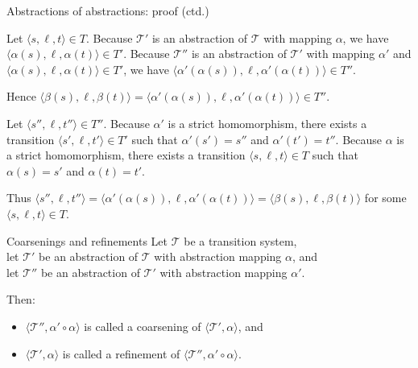 \documentclass{gkibeamer}
\begin{document}
\begin{frame}{Abstractions of abstractions: proof (ctd.)}
  \begin{proofend}
    
    Let $\langle s, \ell, t\rangle \in T$. Because $\mathcal T'$ is an
    abstraction of $\mathcal T$ with mapping $\alpha$, we have
    $\langle \alpha(s), \ell, \alpha(t)\rangle \in T'$. 
    Because $\mathcal T''$ is an abstraction of $\mathcal T'$ with
    mapping $\alpha'$ and $\langle \alpha(s), \ell, \alpha(t)\rangle \in
    T'$, we have $\langle \alpha'(\alpha(s)), \ell,
    \alpha'(\alpha(t))\rangle \in T''$.

    Hence $\langle \beta(s), \ell, \beta(t)\rangle =
    \langle \alpha'(\alpha(s)), \ell, \alpha'(\alpha(t))\rangle \in T''$.

    \pause
    \medskip


    Let $\langle s'', \ell, t''\rangle \in T''$. Because $\alpha'$ is a
    strict homomorphism, there exists a transition $\langle s', \ell, t'\rangle
    \in T'$ such that $\alpha'(s') = s''$ and $\alpha'(t') = t''$.
    Because $\alpha$ is a strict homomorphism, there exists a transition
    $\langle s, \ell, t\rangle \in T$ such that $\alpha(s) = s'$ and
    $\alpha(t) = t'$.

    Thus $\langle s'', \ell, t''\rangle = \langle \alpha'(\alpha(s)), \ell,
    \alpha'(\alpha(t))\rangle = \langle \beta(s), \ell, \beta(t)\rangle$
    for some $\langle s, \ell, t\rangle \in T$.
  \end{proofend}
\end{frame}

\begin{frame}{Coarsenings and refinements}
  Let $\mathcal T$ be a transition system, \\
  let $\mathcal T'$ be an abstraction of $\mathcal T$ with abstraction
  mapping $\alpha$,
  and \\ let $\mathcal T''$ be an abstraction of $\mathcal T'$ with
  abstraction mapping $\alpha'$.

  \smallskip

  Then:
  \begin{itemize}
  \item $\langle \mathcal T'', \alpha' \circ \alpha\rangle$ is called a
    \alert{coarsening} of $\langle \mathcal T', \alpha\rangle$, and
  \item $\langle \mathcal T', \alpha\rangle$ is called a
    \alert{refinement} of $\langle \mathcal T'', \alpha' \circ
    \alpha\rangle$.
  \end{itemize}
\end{frame}
\end{document}
